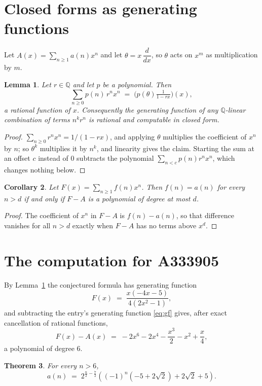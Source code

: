 \documentclass[11pt,a4paper]{article}
\theoremstyle{plain}
\newtheorem{theorem}{Theorem}
\newtheorem{lemma}[theorem]{Lemma}
\newtheorem{corollary}[theorem]{Corollary}
\theoremstyle{definition}
\begin{document}
\section{Closed forms as generating functions}

Let $A(x)=\sum_{n\ge 1}a(n)x^{n}$ and let $\theta=x\,\dfrac{d}{dx}$, so $\theta$
acts on $x^{m}$ as multiplication by $m$.

\begin{lemma}\label{lem:gf}
Let $r\in\mathbb{Q}$ and let $p$ be a polynomial. Then
\[
\sum_{n\ge0}p(n)\,r^{n}x^{n}\;=\;\bigl(p(\theta)\tfrac{1}{1-rx}\bigr)(x),
\]
a rational function of $x$. Consequently the generating function of any
$\mathbb{Q}$-linear combination of terms $n^{k}r^{n}$ is rational and computable in
closed form.
\end{lemma}

\begin{proof}
$\sum_{n\ge0}r^{n}x^{n}=1/(1-rx)$, and applying $\theta$ multiplies the coefficient of
$x^{n}$ by $n$; so $\theta^{k}$ multiplies it by $n^{k}$, and linearity gives the claim.
Starting the sum at an offset $c$ instead of $0$ subtracts the polynomial
$\sum_{n<c}p(n)r^{n}x^{n}$, which changes nothing below.
\end{proof}

\begin{corollary}\label{cor:criterion}
Let $F(x)=\sum_{n\ge 1}f(n)x^{n}$. Then $f(n)=a(n)$ for every $n>d$ if and only
if $F-A$ is a polynomial of degree at most $d$.
\end{corollary}

\begin{proof}
The coefficient of $x^{n}$ in $F-A$ is $f(n)-a(n)$, so that difference vanishes for all
$n>d$ exactly when $F-A$ has no terms above $x^{d}$.
\end{proof}

\section{The computation for A333905}

By Lemma~\ref{lem:gf} the conjectured formula has generating function
\[
F(x)\;=\;\frac{x \left(- 4 x - 5\right)}{4 \left(2 x^{2} - 1\right)} ,
\]
and subtracting the entry's generating function \eqref{eq:gf} gives, after exact
cancellation of rational functions,
\[
F(x)-A(x)\;=\;- 2 x^{6} - 2 x^{4} - \frac{x^{3}}{2} - x^{2} + \frac{x}{4} ,
\]
a polynomial of degree $6$.

\begin{theorem}
For every $n>6$,
\[
a(n)\;=\;2^{\frac{n}{2} - \frac{7}{2}} \left(\left(-1\right)^{n} \left(-5 + 2 \sqrt{2}\right) + 2 \sqrt{2} + 5\right) .
\]
\end{theorem}
\end{document}
